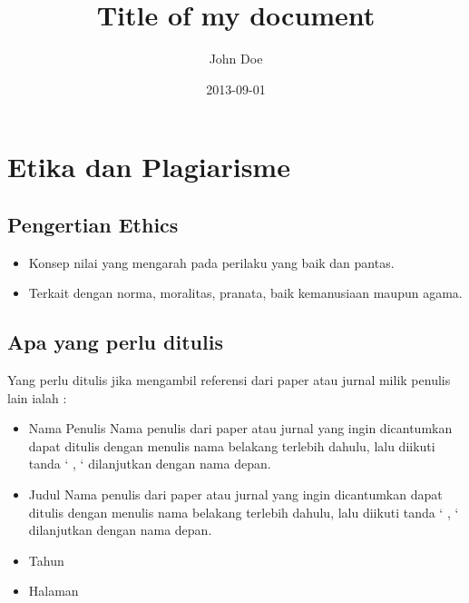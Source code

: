 \documentclass{article}
\title{Title of my document}
\date{2013-09-01}
\author{John Doe}
\begin{document}
\maketitle
{}
\newpage
{}

\section{Etika dan Plagiarisme}

\subsection{Pengertian Ethics}
\begin{itemize}
    \item Konsep nilai yang mengarah pada perilaku yang baik dan pantas.
    \item Terkait dengan norma, moralitas, pranata, baik kemanusiaan maupun agama.
\end{itemize}

\subsection{Apa yang perlu ditulis}
Yang perlu ditulis jika mengambil referensi dari paper atau jurnal milik penulis lain ialah :
\begin{itemize}
  \item Nama Penulis
   \newline Nama penulis dari paper atau jurnal yang ingin dicantumkan dapat ditulis dengan menulis nama belakang terlebih dahulu, lalu diikuti tanda ‘ , ‘ dilanjutkan dengan nama depan.
  \item Judul
  \newline Nama penulis dari paper atau jurnal yang ingin dicantumkan dapat ditulis dengan menulis nama belakang terlebih dahulu, lalu diikuti tanda ‘ , ‘ dilanjutkan dengan nama depan.
  \item Tahun
  \item Halaman
\end{itemize}
\end{document}
